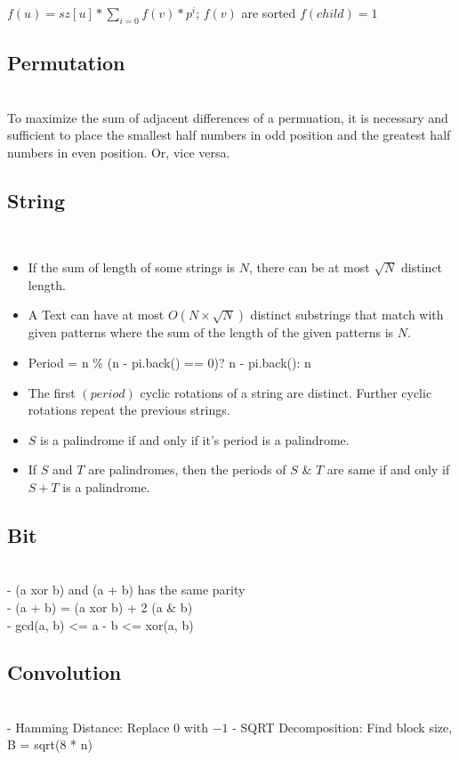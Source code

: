 \( f(u) = sz[u] * \sum_{i = 0} f(v) * p^{i} \);    \( f(v) \) are sorted \)
\( f(child) = 1 \)

\subsection{Permutation} \\
To maximize the sum of adjacent differences of a permuation, it is necessary and sufficient to place the smallest half numbers in odd position and the greatest half numbers in even position. Or, vice versa.

\subsection{String} \\

\begin{itemize}
  \item If the sum of length of some strings is \( N \), there can be at most \( \sqrt{N} \) distinct length. \\
  \item A Text can have at most \( O(N \times \sqrt{N}) \) distinct substrings that match with given patterns where the sum of the length of the given patterns is \( N \). \\
  \item Period =  n \% (n - pi.back() == 0)? n - pi.back(): n \\
  \item The first \( (period) \) cyclic rotations of a string are distinct. Further cyclic rotations repeat the previous strings. \\
  \item \( S \) is a palindrome if and only if it's period is a palindrome. \\
  \item If $S$ and $T$ are palindromes, then the periods of $S$ & $T$ are same if and only if $S + T$ is a palindrome.
\end{itemize}

\subsection{Bit} \\
- (a xor b) and (a + b) has the same parity \\
- (a + b) = (a xor b) + 2 (a & b) \\
- gcd(a, b) <= a - b <= xor(a, b) \\

\subsection{Convolution} \\
- Hamming Distance: Replace \( 0 \) with \( -1 \)
- SQRT Decomposition: Find block size, B = sqrt(8 * n)